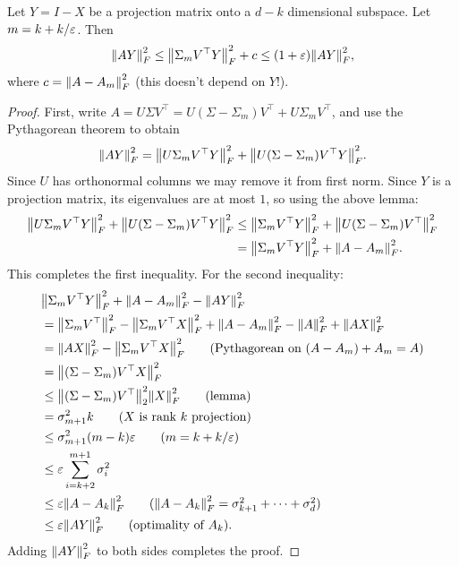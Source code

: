 \documentclass{article}
\begin{document}
\begin{thm}[]
    Let $Y = I-X$ be a projection matrix onto a $d-k$ dimensional subspace. Let $m = k + k/\eps $. Then 
    \[
        \norm*{AY}_{F}^2  \leq \norm*{\Sigma _m V^{\top} Y}_{F}^2  + c \leq (1+\eps )\norm*{AY}_{F} ^2,
    \]
    where $c = \norm*{A - A_m}_{F} ^2 $ (this doesn't depend on $Y$!). 
\end{thm}
\begin{proof}
    First, write $A = U\Sigma V^{\top} = U(\Sigma - \Sigma _m )V^{\top} + U\Sigma _m V^{\top} $, and use the Pythagorean theorem to obtain
    \[
        \norm*{AY}_{F} ^2 = \norm*{U\Sigma _m V^{\top} Y}_{F} ^2 + \norm*{U(\Sigma - \Sigma _m )V^{\top} Y}_{F} ^2 . 
    \]
    Since $U$ has orthonormal columns we may remove it from first norm. Since $Y$ is a projection matrix, its eigenvalues are at most $1$, so using the above lemma:
    \begin{align*}
        \norm*{U\Sigma _m V^{\top} Y}_{F} ^2 + \norm*{U(\Sigma - \Sigma _m )V^{\top} Y}_{F} ^2 &\leq \norm*{\Sigma _m V^{\top} Y}_{F} ^2 + \norm*{U(\Sigma - \Sigma _m )V^{\top}}_{F} ^2\\
        &= \norm*{\Sigma _m V^{\top} Y}_{F} ^2 + \norm*{A- A_m }_{F} ^2.
    \end{align*}
    This completes the first inequality. For the second inequality:
    \begin{align*}
        &\norm*{\Sigma _m V^{\top} Y}_{F} ^2 + \norm*{A- A_m }_{F} ^2 - \norm*{AY}_{F} ^2\\
        &= \norm*{\Sigma _m V^{\top} }_{F} ^2 - \norm*{\Sigma _m V^{\top} X}_{F}^2  + \norm*{A- A_m }_{F} ^2  - \norm*{A}_{F} ^2 + \norm*{AX}_{F} ^2\\
        &= \norm*{AX}_{F} ^2 - \norm*{\Sigma _m V^{\top} X}_{F}^2  \tag{Pythagorean on $(A-A_m ) + A_m = A$}\\
        &= \norm*{(\Sigma - \Sigma _m )V^{\top} X}_{F} ^2 \\
        &\leq \norm*{(\Sigma -\Sigma _m) V^{\top} }_2 ^2\norm*{X}_{F} ^2 \tag{lemma}\\
        &=  \sigma _{m+1} ^2 k \tag{$X$ is rank $k$ projection}\\
        &\leq \sigma _{m+1} ^2 (m - k)\eps \tag{$m = k + k/\eps $}\\
        &\leq  \eps \sum _{i = k+2} ^{m+1} \sigma _i ^2 \\
        &\leq \eps \norm*{A - A_k }_{F} ^2 \tag{$\norm*{A-A_k }_{F} ^2 = \sigma _{k+1}^2 +\dots +\sigma _{d}^2$}\\
        &\leq \eps \norm*{AY}_{F} ^2 \tag{optimality of $A_k $}. 
    \end{align*}
    Adding $\norm*{AY}_{F} ^2 $ to both sides completes the proof. 
\end{proof}
\end{document}
